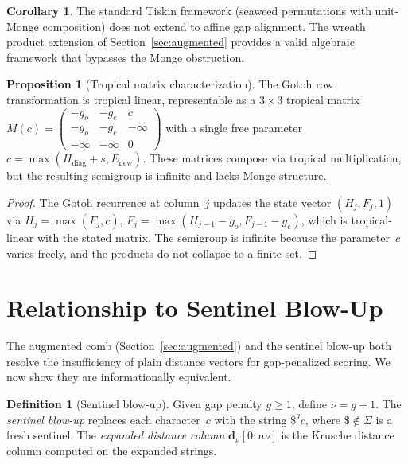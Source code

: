 \documentclass[11pt, a4paper]{article}
\theoremstyle{definition}
\newtheorem{definition}[theorem]{Definition}
\newtheorem{proposition}[theorem]{Proposition}
\newtheorem{corollary}[theorem]{Corollary}
\theoremstyle{remark}
\newcommand{\dcol}{\mathbf{d}}
\begin{document}
\begin{corollary}
The standard Tiskin framework (seaweed permutations with
unit-Monge composition) does not extend to affine gap alignment.
The wreath product extension of Section~\ref{sec:augmented}
provides a valid algebraic framework that bypasses the Monge
obstruction.
\end{corollary}

\begin{proposition}[Tropical matrix characterization]
\label{prop:tropical-matrix}
The Gotoh row transformation is tropical linear, representable
as a $3 {\times} 3$ tropical matrix
$M(c) = \left(\begin{smallmatrix}
  -g_o & -g_e & c \\ -g_o & -g_e & -\infty \\
  -\infty & -\infty & 0
\end{smallmatrix}\right)$
with a single free parameter
$c = \max(H_{\mathrm{diag}} + s, E_{\mathrm{new}})$.
These matrices compose via tropical multiplication, but the
resulting semigroup is infinite and lacks Monge structure.
\end{proposition}

\begin{proof}
The Gotoh recurrence at column~$j$ updates the state vector
$(H_j, F_j, 1)$ via
$H_j = \max(F_j, c)$, $F_j = \max(H_{j-1} - g_o, F_{j-1} - g_e)$,
which is tropical-linear with the stated matrix.
The semigroup is infinite because the parameter~$c$ varies
freely, and the products do not collapse to a finite set.
\end{proof}

\section{Relationship to Sentinel Blow-Up}\label{sec:blowup}

The augmented comb (Section~\ref{sec:augmented}) and the sentinel
blow-up both resolve the insufficiency of plain distance vectors
for gap-penalized scoring.
We now show they are informationally
equivalent.

\begin{definition}[Sentinel blow-up]
\label{def:blowup}
Given gap penalty $g \ge 1$, define $\nu = g + 1$.
The
\emph{sentinel blow-up} replaces each character~$c$ with the
string $\$^g c$, where $\$ \notin \Sigma$ is a fresh sentinel.
The \emph{expanded distance column}
$\dcol_\nu[0{:}n\nu]$ is the Krusche distance column computed
on the expanded strings.
\end{definition}
\end{document}
